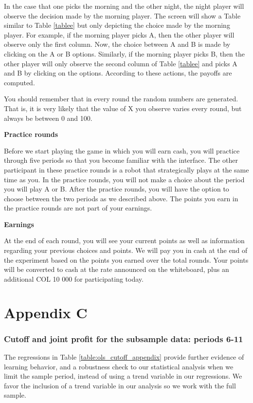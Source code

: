 \documentclass[12pt, letterpaper]{article}
\theoremstyle{plain}
\begin{document}
In the case that one picks the morning and the other night, the night player will observe the decision made by the morning player. The screen will show a Table similar to Table \ref{tablee} but only depicting the choice made by the morning player. For example, if the morning player picks A, then the other player will observe only the first column. Now, the choice between A and B is made by clicking on the A or B options. Similarly, if the morning player picks B, then the other player will only observe the second column of Table \ref{tablee} and picks A and B by clicking on the options. According to these actions, the payoffs are computed. 

You should remember that in every round the random numbers are generated. That is, it is very likely that the value of X you observe varies every round, but always be between 0 and 100. 

\noindent \textbf{Practice rounds}

Before we start playing the game in which you will earn cash, you will practice through five periods so that you become familiar with the interface. The other participant in these practice rounds is a robot that strategically plays at the same time as you. In the practice rounds, you will not make a choice about the period you will play A or B. After the practice rounds, you will have the option to choose between the two periods as we described above. The points you earn in the practice rounds are not part of your earnings.


\noindent \textbf{Earnings}

At the end of each round, you will see your current points as well as information regarding your previous choices and points.  We will pay you in cash at the end of the experiment based on the points you earned over the total rounds. Your points will be converted to cash at the rate announced on the whiteboard, plus an additional COL 10 000 for participating today. 

\newpage
\noindent  \section*{ Appendix C}
 \subsubsection*{Cutoff and joint profit for the subsample data: periods 6-11}

The regressions in Table \ref{table:ols_cutoff_appendix} provide further evidence of learning behavior, and a robustness check to our statistical analysis when we limit the sample period, instead of using a trend variable in our regressions. We favor the inclusion of a trend variable in our analysis so we work with the full sample. 
\end{document}
